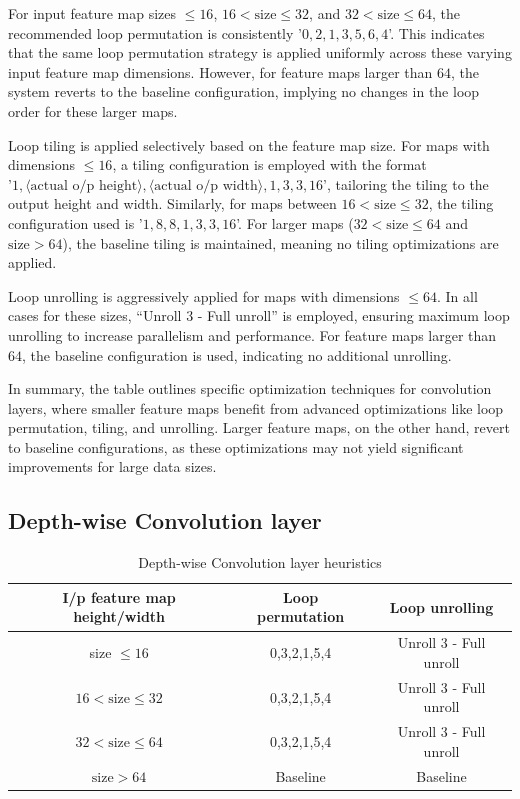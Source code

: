 For input feature map sizes \( \leq 16 \), \( 16 < \text{size} \leq 32 \), and \( 32 < \text{size} \leq 64 \), the recommended loop permutation is consistently '\( 0,2,1,3,5,6,4 \)'. This indicates that the same loop permutation strategy is applied uniformly across these varying input feature map dimensions. However, for feature maps larger than \( 64 \), the system reverts to the baseline configuration, implying no changes in the loop order for these larger maps.

Loop tiling is applied selectively based on the feature map size. For maps with dimensions \( \leq 16 \), a tiling configuration is employed with the format \\ '\( 1,\langle \text{actual o/p height} \rangle,\langle \text{actual o/p width} \rangle,1,3,3,16 \)', tailoring the tiling to the output height and width. Similarly, for maps between \( 16 < \text{size} \leq 32 \), the tiling configuration used is '\( 1,8,8,1,3,3,16 \)'. For larger maps (\( 32 < \text{size} \leq 64 \) and \( \text{size} > 64 \)), the baseline tiling is maintained, meaning no tiling optimizations are applied.

Loop unrolling is aggressively applied for maps with dimensions \( \leq 64 \). In all cases for these sizes, ``Unroll 3 - Full unroll'' is employed, ensuring maximum loop unrolling to increase parallelism and performance. For feature maps larger than \( 64 \), the baseline configuration is used, indicating no additional unrolling.

In summary, the table outlines specific optimization techniques for convolution layers, where smaller feature maps benefit from advanced optimizations like loop permutation, tiling, and unrolling. Larger feature maps, on the other hand, revert to baseline configurations, as these optimizations may not yield significant improvements for large data sizes.



\subsection{Depth-wise Convolution layer}

\begin{table}[H]
\centering
\caption{Depth-wise Convolution layer heuristics}
\label{tab:heuristicDconvolution}
\begin{tabular}{|c|c|c|}
\hline
\textbf{I/p feature map height/width} & \textbf{Loop permutation} & \textbf{Loop unrolling} \\ \hline
size $\leq 16$ & 0,3,2,1,5,4 & Unroll 3 - Full unroll \\ \hline
$16 < \text{size} \leq 32$ & 0,3,2,1,5,4 & Unroll 3 - Full unroll \\ \hline
$32 < \text{size} \leq 64$ & 0,3,2,1,5,4 & Unroll 3 - Full unroll \\ \hline
$\text{size} > 64$ & Baseline & Baseline \\ \hline
\end{tabular}
\end{table}

